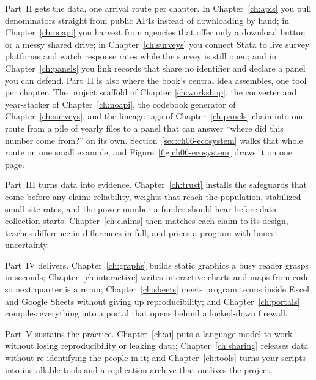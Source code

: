 Part~II gets the data, one arrival route per chapter. In Chapter~\ref{ch:apis} you pull denominators straight from public APIs instead of downloading by hand; in Chapter~\ref{ch:noapi} you harvest from agencies that offer only a download button or a messy shared drive; in Chapter~\ref{ch:surveys} you connect Stata to live survey platforms and watch response rates while the survey is still open; and in Chapter~\ref{ch:panels} you link records that share no identifier and declare a panel you can defend. Part~II is also where the book's central idea assembles, one tool per chapter. The project scaffold of Chapter~\ref{ch:workshop}, the converter and year-stacker of Chapter~\ref{ch:noapi}, the codebook generator of Chapter~\ref{ch:surveys}, and the lineage tags of Chapter~\ref{ch:panels} chain into one route from a pile of yearly files to a panel that can answer \enquote{where did this number come from?} on its own. Section~\ref{sec:ch06-ecosystem} walks that whole route on one small example, and Figure~\ref{fig:ch06-ecosystem} draws it on one page.

Part~III turns data into evidence. Chapter~\ref{ch:trust} installs the safeguards that come before any claim: reliability, weights that reach the population, stabilized small-site rates, and the power number a funder should hear before data collection starts. Chapter~\ref{ch:claims} then matches each claim to its design, teaches difference-in-differences in full, and prices a program with honest uncertainty.

Part~IV delivers. Chapter~\ref{ch:graphs} builds static graphics a busy reader grasps in seconds; Chapter~\ref{ch:interactive} writes interactive charts and maps from code so next quarter is a rerun; Chapter~\ref{ch:sheets} meets program teams inside Excel and Google Sheets without giving up reproducibility; and Chapter~\ref{ch:portals} compiles everything into a portal that opens behind a locked-down firewall.

Part~V sustains the practice. Chapter~\ref{ch:ai} puts a language model to work without losing reproducibility or leaking data; Chapter~\ref{ch:sharing} releases data without re-identifying the people in it; and Chapter~\ref{ch:tools} turns your scripts into installable tools and a replication archive that outlives the project.

